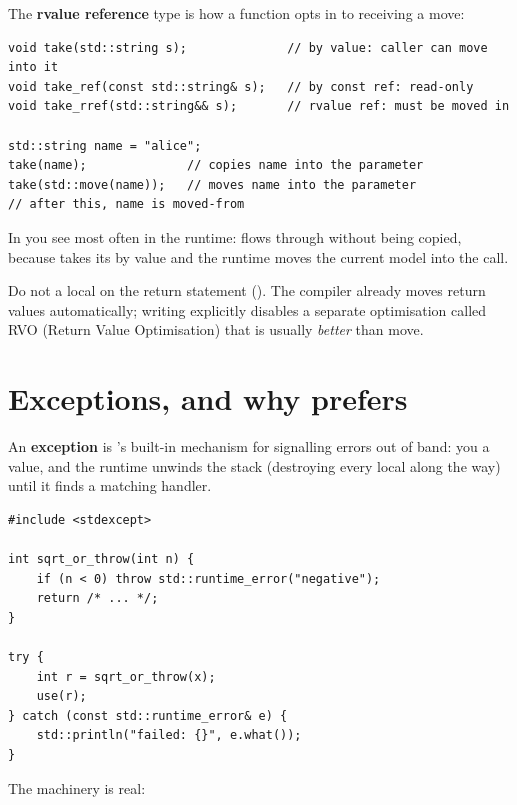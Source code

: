 The \textbf{rvalue reference} type  is how a function
opts in to receiving a move:

\begin{lstlisting}
void take(std::string s);              // by value: caller can move into it
void take_ref(const std::string& s);   // by const ref: read-only
void take_rref(std::string&& s);       // rvalue ref: must be moved in

std::string name = "alice";
take(name);              // copies name into the parameter
take(std::move(name));   // moves name into the parameter
// after this, name is moved-from
\end{lstlisting}

In \maya{} you see  most often in the runtime:
 flows through  without being
copied, because  takes its  by value and
the runtime moves the current model into the call.

\begin{warning}
Do not  a local on the return statement (). The compiler already moves return values
automatically; writing  explicitly disables a
separate optimisation called RVO (Return Value Optimisation) that is
usually \emph{better} than move.
\end{warning}

\section{Exceptions, and why \maya{} prefers }
\label{sec:cpp:exceptions}

An \textbf{exception} is \cpp{}'s built-in mechanism for signalling
errors out of band: you  a value, and the runtime unwinds
the stack (destroying every local along the way) until it finds a
matching  handler.

\begin{lstlisting}
#include <stdexcept>

int sqrt_or_throw(int n) {
    if (n < 0) throw std::runtime_error("negative");
    return /* ... */;
}

try {
    int r = sqrt_or_throw(x);
    use(r);
} catch (const std::runtime_error& e) {
    std::println("failed: {}", e.what());
}
\end{lstlisting}

The machinery is real:

